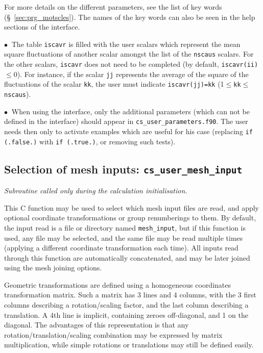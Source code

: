 {{For more details on the different parameters, see the list of key words  (\S~\ref{sec:prg_motscles}).
 The names of the key words can also be seen in the help sections of the interface.

$\bullet\ $ The table \texttt{iscavr} is filled with the user scalars which represent the mean square fluctuations of another scalar amongst the list of the \texttt{nscaus} scalars. For the other scalars, \texttt{iscavr} does not need to be completed (by default,
\texttt{iscavr(ii)}$\leqslant$0). For instance, if the scalar \texttt{jj}
represents the average of the square of the fluctuations of the scalar \texttt{kk},
the user must indicate \texttt{iscavr(jj)=kk}
(1$\leqslant$\texttt{kk}$\leqslant$\texttt{nscaus}).

\noindent
$\bullet\ $ When using the interface, only the
additional parameters (which can not be defined in the interface)
should appear in \texttt{cs\_user\_parameters.f90}. The user
needs then only to activate examples which are useful for his
case (replacing \texttt{if (.false.)} with \texttt{if (.true.)},
or removing such tests).

\subsection{Selection of mesh inputs: \textmd{\texttt{cs\_user\_mesh\_input}}}

\noindent
\textit{Subroutine called only during the calculation initialisation.}

This C function may be used to select which mesh input files
are read, and apply optional coordinate transformations or group renumberings
to them. By default, the input read is a file or directory named
\texttt{mesh\_input}, but if this function is used, any file may be selected,
and the same file may be read multiple times (applying a different
coordinate transformation each time).
All inputs read through this function are automatically concatenated, and
may be later joined using the mesh joining options.

Geometric transformations are defined using a homogeneous coordinates
transformation matrix. Such a matrix has 3 lines and 4 columns, with the
3 first columns describing a rotation/scaling factor, and the last column
describing a translation. A 4th line is implicit, containing zeroes
off-diagonal, and 1 on the diagonal. The advantages of this representation
is that any rotation/translation/scaling combination may be expressed
by matrix multiplication, while simple rotations or translations
may still be defined easily.

}}
